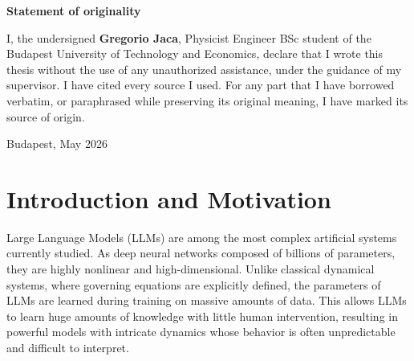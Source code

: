\documentclass[a4paper,12pt]{article}
\begin{document}
    \vspace*{1 cm}

    \begin{center}
        {\Large \textbf{Statement of originality}}
    \end{center}

    \vspace{0.5 cm}

    I, the undersigned \textbf{Gregorio Jaca}, Physicist Engineer BSc student of the Budapest University of Technology and Economics, declare that I wrote this thesis without the use of any unauthorized assistance, under the guidance of my supervisor. I have cited every source I used. For any part that I have borrowed verbatim, or paraphrased while preserving its original meaning,
    I have marked its source of origin.

    \vspace{1 cm}

    Budapest, May 2026

    \vspace{0.2 cm}

    \par\noindent\makebox[10cm][l]     \hfill\makebox[5cm][l]{\hrulefill}
    \par\noindent\makebox[10cm][l]     \hfill{}

    \newpage

    {
    \hypersetup{linkcolor=black}
    \tableofcontents
    }
    \newpage

    \section{Introduction and Motivation}
    \label{sec:introduction}
    Large Language Models (LLMs) are among the most complex artificial systems currently studied. As deep neural networks composed of billions of parameters, they are highly nonlinear and high-dimensional. Unlike classical dynamical systems, where governing equations are explicitly defined, the parameters of LLMs are learned during training on massive amounts of data. This allows LLMs to learn huge amounts of knowledge with little human intervention, resulting in powerful models with intricate dynamics whose behavior is often unpredictable and difficult to interpret.
\end{document}
